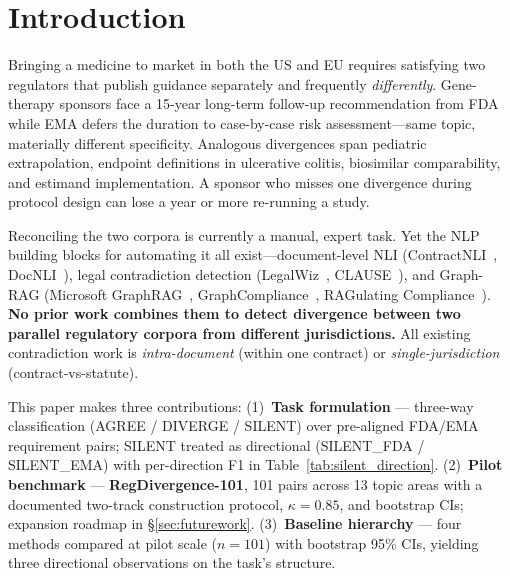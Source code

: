 \documentclass[manuscript]{acmart}
\begin{document}


\maketitle

\section{Introduction}

Bringing a medicine to market in both the US and EU requires satisfying two
regulators that publish guidance separately and frequently \textit{differently}.
Gene-therapy sponsors face a 15-year long-term follow-up recommendation from FDA
while EMA defers the duration to case-by-case risk assessment---same topic,
materially different specificity. Analogous divergences span pediatric
extrapolation, endpoint definitions in ulcerative colitis, biosimilar
comparability, and estimand implementation. A sponsor who misses one divergence
during protocol design can lose a year or more re-running a study.

Reconciling the two corpora is currently a manual, expert task. Yet the NLP
building blocks for automating it all exist---document-level NLI
(ContractNLI~\cite{koreeda2021contractnli}, DocNLI~\cite{yin2021docnli}),
legal contradiction detection (LegalWiz~\cite{legalwiz2025},
CLAUSE~\cite{betterclause2026}), and Graph-RAG (Microsoft
GraphRAG~\cite{edge2024graphrag}, GraphCompliance~\cite{graphcompliance2025},
RAGulating Compliance~\cite{ragulating2025}). \textbf{No prior work combines
them to detect divergence between two parallel regulatory corpora from different
jurisdictions.} All existing contradiction work is \textit{intra-document}
(within one contract) or \textit{single-jurisdiction} (contract-vs-statute).

This paper makes three contributions: (1)~\textbf{Task formulation} ---
three-way classification (AGREE / DIVERGE / SILENT) over pre-aligned FDA/EMA
requirement pairs; SILENT treated as directional (SILENT\_FDA / SILENT\_EMA)
with per-direction F1 in Table~\ref{tab:silent_direction}. (2)~\textbf{Pilot
benchmark} --- \textbf{RegDivergence-101}, 101 pairs across 13 topic areas with
a documented two-track construction protocol, $\kappa = 0.85$, and bootstrap
CIs; expansion roadmap in \S\ref{sec:futurework}. (3)~\textbf{Baseline
hierarchy} --- four methods compared at pilot scale ($n = 101$) with bootstrap
95\% CIs, yielding three directional observations on the task's structure.
\end{document}
